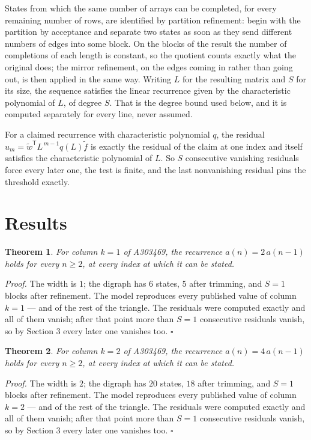 \documentclass[11pt]{article}
\newtheorem{theorem}{Theorem}
\theoremstyle{definition}
\begin{document}
States from which the same number of arrays can be completed, for every remaining number of rows, are identified by partition refinement: begin with the partition by acceptance and separate two states as soon as they send different numbers of edges into some block. On the blocks of the result the number of completions of each length is constant, so the quotient counts exactly what the original does; the mirror refinement, on the edges coming in rather than going out, is then applied in the same way. Writing $L$ for the resulting matrix and $S$ for its size, the sequence satisfies the linear recurrence given by the characteristic polynomial of $L$, of degree $S$. That is the degree bound used below, and it is computed separately for every line, never assumed.

For a claimed recurrence with characteristic polynomial $q$, the residual $u_m = \tilde w^{\mathsf T}L^{\,m-1}q(L)\tilde f$ is exactly the residual of the claim at one index and itself satisfies the characteristic polynomial of $L$. So $S$ consecutive vanishing residuals force every later one, the test is finite, and the last nonvanishing residual pins the threshold exactly.

\section{Results}

\begin{theorem} For column $k = 1$ of A303469, the recurrence $a(n) = 2\,a(n-1)$ holds for every $n \ge 2$, at every index at which it can be stated.\end{theorem}

{\itshape Proof.} The width is $1$; the digraph has $6$ states, $5$ after trimming, and $S = 1$ blocks after refinement. The model reproduces every published value of column $k = 1$ --- and of the rest of the triangle. The residuals were computed exactly and all of them vanish; after that point more than $S = 1$ consecutive residuals vanish, so by Section 3 every later one vanishes too. $\square$

\begin{theorem} For column $k = 2$ of A303469, the recurrence $a(n) = 4\,a(n-1)$ holds for every $n \ge 2$, at every index at which it can be stated.\end{theorem}

{\itshape Proof.} The width is $2$; the digraph has $20$ states, $18$ after trimming, and $S = 1$ blocks after refinement. The model reproduces every published value of column $k = 2$ --- and of the rest of the triangle. The residuals were computed exactly and all of them vanish; after that point more than $S = 1$ consecutive residuals vanish, so by Section 3 every later one vanishes too. $\square$
\end{document}
